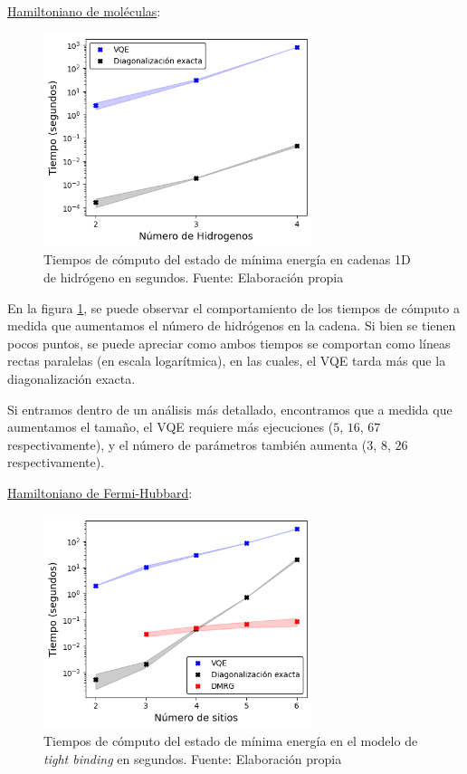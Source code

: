 \underline{Hamiltoniano de moléculas}: 
\begin{figure}[H]
\centering
\includegraphics[width=0.7\textwidth]{figures/S4/moleculas/tiempomoleculas.png}
\caption{\label{fig:33} Tiempos de cómputo del estado de mínima energía en cadenas 1D de hidrógeno en segundos. Fuente: Elaboración propia}
\end{figure}

En la figura \ref{fig:33}, se puede observar el comportamiento de los tiempos de cómputo a medida que aumentamos el número de hidrógenos en la cadena. Si bien se tienen pocos puntos, se puede apreciar como ambos tiempos se comportan como líneas rectas paralelas (en escala logarítmica), en las cuales, el VQE tarda más que la diagonalización exacta.

Si entramos dentro de un análisis más detallado, encontramos que a medida que aumentamos el tamaño, el VQE requiere más ejecuciones ($5$, $16$, $67$ respectivamente), y el número de parámetros también aumenta ($3$, $8$, $26$ respectivamente).


\underline{Hamiltoniano de Fermi-Hubbard}: 
\begin{figure}[H]
\centering
\includegraphics[width=0.7\textwidth]{figures/S4/tb/tiempotb.png}
\caption{\label{fig:34} Tiempos de cómputo del estado de mínima energía en el modelo de \textit{tight binding} en segundos. Fuente: Elaboración propia}
\end{figure}

